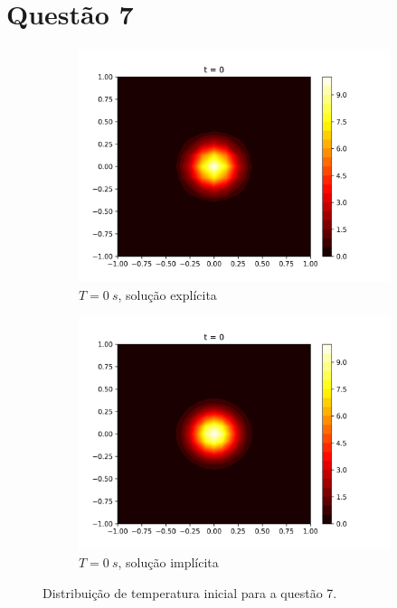 \documentclass{article}
\begin{document}
\section{Questão 7}

\begin{figure}
\centering
     \begin{subfigure}[b]{0.49\textwidth}
         \centering
         \includegraphics[width=\textwidth]{figs/q7a_heatmap_t0.png}
         \caption{$T=0~s$, solução explícita}
	\label{fig:q7a_heatmap_t0}
     \end{subfigure}
     \hfill
     \begin{subfigure}[b]{0.49\textwidth}
         \centering
     \includegraphics[width=\textwidth]{figs/q7b_heatmap_t0.png}
         \caption{$T=0~s$, solução implícita}
	\label{fig:q7b_heatmap_t0}
     \end{subfigure}
	\caption{Distribuição de temperatura inicial para a questão 7.}
\end{figure}
\end{document}
